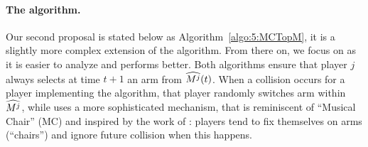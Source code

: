 \paragraph{The \MCTopM{} algorithm.}
%
Our second proposal \MCTopM{} is stated below as Algorithm~\ref{algo:5:MCTopM},
it is a slightly more complex extension of the \RandTopM{} algorithm.
From there on, we focus on \MCTopM{} as it is easier to analyze and performs better.
%
Both algorithms ensure that player $j$ always
selects at time $t+1$ an arm from $\widehat{M^j}(t)$.
When a collision occurs for a player implementing the \RandTopM{} algorithm, that player randomly switches arm within $\widehat{M^j}$, while \MCTopM{} uses a more sophisticated mechanism, that is reminiscent of ``Musical Chair'' (MC) and inspired by the work of \cite{Rosenski16}: players tend to fix themselves on arms (``chairs'') and ignore future collision when this happens.


